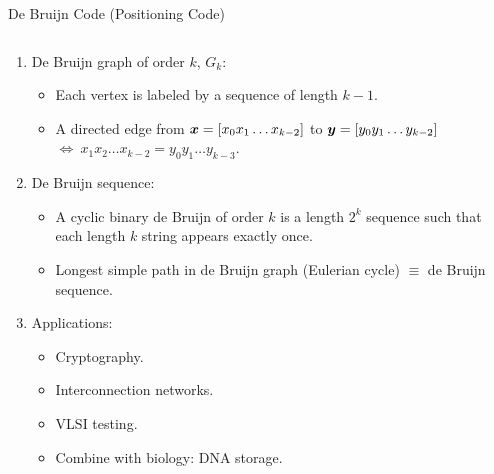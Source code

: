 \begin{frame}{De Bruijn Code (Positioning Code)}
    \begin{columns}
        \begin{column}{0.65\textwidth}
            \begin{enumerate}
                \item De Bruijn graph of order $k$, $G_{k}$:
                \begin{itemize}
                    \item Each vertex is labeled by a sequence of length $k-1$.
                    \item A directed edge from ${\boldsymbol x} = \left[x_{0}x_{1}\ldots x_{k-2}\right]$ to ${\boldsymbol y}=\left[y_{0}y_{1}\ldots y_{k-2}\right]$ $\Leftrightarrow\ x_{1}x_{2}\ldots x_{k-2}=y_{0}y_{1}\ldots y_{k-3}$. 
                \end{itemize}
                \item De Bruijn sequence:
                \begin{itemize}
                    \item A cyclic binary de Bruijn of order $k$ is a length $2^{k}$ sequence such that each length $k$ string appears exactly once.
                    \item Longest simple path in de Bruijn graph (Eulerian cycle) $\equiv$ de Bruijn sequence.
                \end{itemize}
                
                \item Applications:
                \begin{itemize}
                    \item Cryptography.
                    \item Interconnection networks.
                    \item VLSI testing.
                    \item Combine with biology: DNA storage.
                \end{itemize}
            \end{enumerate}
        \end{column}
        

\end{columns}
\end{frame}
